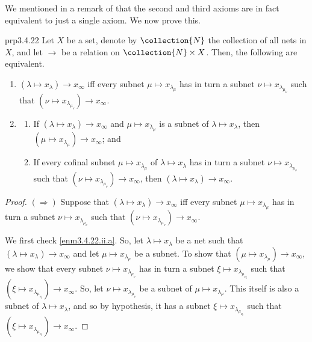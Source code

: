 We mentioned in a remark of  that the second and third axioms are in fact equivalent to just a single axiom.  We now prove this.
\begin{prp}{}{prp3.4.22}
Let $X$ be a set, denote by $\collection{N}$ the collection of all nets in $X$, and let $\to$ be a relation on $\collection{N}\times X$.  Then, the following are equivalent.
\begin{enumerate}
\item \label{enm3.4.22.i}$(\lambda \mapsto x_\lambda )\to x_\infty$ iff every subnet $\mu \mapsto x_{\lambda _\mu}$ has in turn a subnet $\nu \mapsto x_{\lambda _{\mu _\nu}}$ such that $(\nu \mapsto x_{\lambda _{\mu _\nu}})\to x_\infty$.
\item \label{enm3.4.22.ii}
\begin{enumerate}
\item \label{enm3.4.22.ii.a}If $(\lambda \mapsto x_\lambda )\to x_\infty$ and $\mu \mapsto x_{\lambda _\mu}$ is a subnet of $\lambda \mapsto x_\lambda$, then $(\mu \mapsto x_{\lambda _\mu})\to x_\infty$; and
\item \label{enm3.4.22.ii.b}If every cofinal subnet $\mu \mapsto x_{\lambda _\mu}$ of $\lambda \mapsto x_{\lambda}$ has in turn a subnet $\nu \mapsto x_{\lambda _{\mu _\nu}}$ such that $(\nu \mapsto x_{\lambda _{\mu _\nu}})\to x_\infty$, then $(\lambda \mapsto x_\lambda )\to x_\infty$.
\end{enumerate}
\end{enumerate}
\begin{proof}
$(\Rightarrow )$ Suppose that $(\lambda \mapsto x_\lambda )\to x_\infty$ iff every subnet $\mu \mapsto x_{\lambda _\mu}$ has in turn a subnet $\nu \mapsto x_{\lambda _{\mu _\nu}}$ such that $(\nu \mapsto x_{\lambda _{\mu _\nu}})\to x_{\infty}$.

We first check \cref{enm3.4.22.ii.a}.  So, let $\lambda \mapsto x_\lambda$ be a net such that $(\lambda \mapsto x_\lambda )\to x_\infty$ and let $\mu \mapsto x_{\lambda _\mu}$ be a subnet.  To show that $(\mu \mapsto x_{\lambda _\mu})\to x_\infty$, we show that every subnet $\nu \mapsto x_{\lambda _{\mu _\nu}}$ has in turn a subnet $\xi \mapsto x_{\lambda _{\mu _{\nu _\xi}}}$ such that $(\xi \mapsto x_{\lambda _{\mu _{\nu _\xi}}})\to x_\infty$.  So, let $\nu \mapsto x_{\lambda _{\mu _\nu}}$ be a subnet of $\mu \mapsto x_{\lambda _\mu}$.  This itself is also a subnet of $\lambda \mapsto x_\lambda$, and so by hypothesis, it has a subnet $\xi \mapsto x_{\lambda _{\mu _{\nu _\xi}}}$ such that $(\xi \mapsto x_{\lambda _{\mu _{\nu _\xi}}})\to x_\infty$.


\end{proof}
\end{prp}
